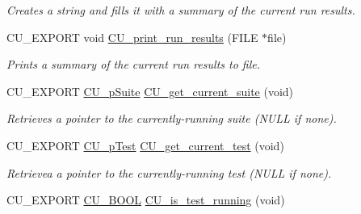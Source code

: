 \begin{DoxyCompactItemize}
\begin{DoxyCompactList}\small\item\em Creates a string and fills it with a summary of the current run results. \end{DoxyCompactList}\item 
C\-U\-\_\-\-E\-X\-P\-O\-R\-T void \hyperlink{group__Framework_ga0eb46055f2b8a8ec90e3c24562e9b9fb}{C\-U\-\_\-print\-\_\-run\-\_\-results} (F\-I\-L\-E $\ast$file)
\begin{DoxyCompactList}\small\item\em Prints a summary of the current run results to file. \end{DoxyCompactList}\item 
C\-U\-\_\-\-E\-X\-P\-O\-R\-T \hyperlink{group__Framework_gaba832ae8b235f5e70d6a4ac9c3bb1219}{C\-U\-\_\-p\-Suite} \hyperlink{group__Framework_ga18a515b080595137afe72034c387e7dd}{C\-U\-\_\-get\-\_\-current\-\_\-suite} (void)
\begin{DoxyCompactList}\small\item\em Retrieves a pointer to the currently-\/running suite (N\-U\-L\-L if none). \end{DoxyCompactList}\item 
C\-U\-\_\-\-E\-X\-P\-O\-R\-T \hyperlink{group__Framework_ga249c43fbe4e53452b3f90db1437da04b}{C\-U\-\_\-p\-Test} \hyperlink{group__Framework_ga71bd5fb9588620f3c73afbbc526a06fb}{C\-U\-\_\-get\-\_\-current\-\_\-test} (void)
\begin{DoxyCompactList}\small\item\em Retrievea a pointer to the currently-\/running test (N\-U\-L\-L if none). \end{DoxyCompactList}\item 
\hypertarget{group__Framework_gad971fa22c8d1349f9d0b97bc95577cb9}{C\-U\-\_\-\-E\-X\-P\-O\-R\-T \hyperlink{group__Framework_gabd98d449e979a6379b06551242106dd4}{C\-U\-\_\-\-B\-O\-O\-L} \hyperlink{group__Framework_gad971fa22c8d1349f9d0b97bc95577cb9}{C\-U\-\_\-is\-\_\-test\-\_\-running} (void)}\label{group__Framework_gad971fa22c8d1349f9d0b97bc95577cb9}


\end{DoxyCompactItemize}
